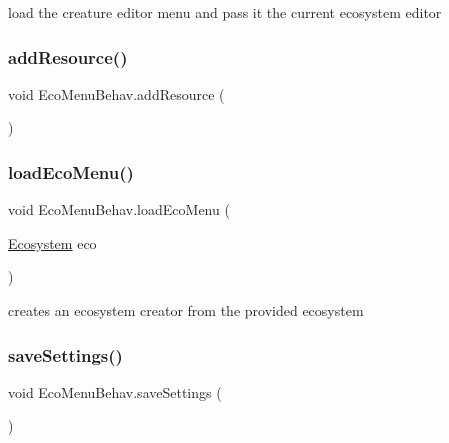 load the creature editor menu and pass it the current ecosystem editor 

\mbox{\label{class_eco_menu_behav_ab08a4156dfbc7df76014ce6dbe6c9577}} 
\subsubsection{\texorpdfstring{add\+Resource()}{addResource()}}
{\footnotesize\ttfamily void Eco\+Menu\+Behav.\+add\+Resource (\begin{DoxyParamCaption}{ }\end{DoxyParamCaption})}

\mbox{\label{class_eco_menu_behav_a039f9149186291b27affa208529483dc}} 
\subsubsection{\texorpdfstring{load\+Eco\+Menu()}{loadEcoMenu()}}
{\footnotesize\ttfamily void Eco\+Menu\+Behav.\+load\+Eco\+Menu (\begin{DoxyParamCaption}\item[{\mbox{\hyperlink{class_ecosystem}{Ecosystem}}}]{eco }\end{DoxyParamCaption})}



creates an ecosystem creator from the provided ecosystem 

\mbox{\label{class_eco_menu_behav_a8ea8d6da55e1a0724a33e59ff0b94834}} 
\subsubsection{\texorpdfstring{save\+Settings()}{saveSettings()}}
{\footnotesize\ttfamily void Eco\+Menu\+Behav.\+save\+Settings (\begin{DoxyParamCaption}{ }\end{DoxyParamCaption})}



